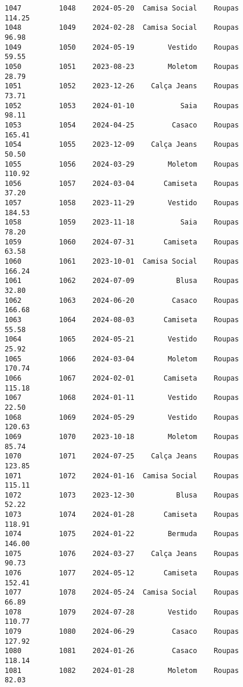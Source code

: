 \documentclass[11pt]{article}
\begin{document}
\begin{Verbatim}[commandchars=\\\{\}]
1047         1048    2024-05-20  Camisa Social    Roupas          114.25   
1048         1049    2024-02-28  Camisa Social    Roupas           96.98   
1049         1050    2024-05-19        Vestido    Roupas           59.55   
1050         1051    2023-08-23        Moletom    Roupas           28.79   
1051         1052    2023-12-26    Calça Jeans    Roupas           73.71   
1052         1053    2024-01-10           Saia    Roupas           98.11   
1053         1054    2024-04-25         Casaco    Roupas          165.41   
1054         1055    2023-12-09    Calça Jeans    Roupas           50.50   
1055         1056    2024-03-29        Moletom    Roupas          110.92   
1056         1057    2024-03-04       Camiseta    Roupas           37.20   
1057         1058    2023-11-29        Vestido    Roupas          184.53   
1058         1059    2023-11-18           Saia    Roupas           78.20   
1059         1060    2024-07-31       Camiseta    Roupas           63.58   
1060         1061    2023-10-01  Camisa Social    Roupas          166.24   
1061         1062    2024-07-09          Blusa    Roupas           32.80   
1062         1063    2024-06-20         Casaco    Roupas          166.68   
1063         1064    2024-08-03       Camiseta    Roupas           55.58   
1064         1065    2024-05-21        Vestido    Roupas           25.92   
1065         1066    2024-03-04        Moletom    Roupas          170.74   
1066         1067    2024-02-01       Camiseta    Roupas          115.18   
1067         1068    2024-01-11        Vestido    Roupas           22.50   
1068         1069    2024-05-29        Vestido    Roupas          120.63   
1069         1070    2023-10-18        Moletom    Roupas           85.74   
1070         1071    2024-07-25    Calça Jeans    Roupas          123.85   
1071         1072    2024-01-16  Camisa Social    Roupas          115.11   
1072         1073    2023-12-30          Blusa    Roupas           52.22   
1073         1074    2024-01-28       Camiseta    Roupas          118.91   
1074         1075    2024-01-22        Bermuda    Roupas          146.00   
1075         1076    2024-03-27    Calça Jeans    Roupas           90.73   
1076         1077    2024-05-12       Camiseta    Roupas          152.41   
1077         1078    2024-05-24  Camisa Social    Roupas           66.89   
1078         1079    2024-07-28        Vestido    Roupas          110.77   
1079         1080    2024-06-29         Casaco    Roupas          127.92   
1080         1081    2024-01-26         Casaco    Roupas          118.14   
1081         1082    2024-01-28        Moletom    Roupas           82.03   

\end{Verbatim}
\end{document}
